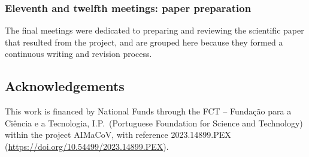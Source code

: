 \documentclass[10pt]{article}
\begin{document}
\subsubsection{Eleventh and twelfth meetings: paper preparation}
The final meetings were dedicated to preparing and reviewing the
scientific paper that resulted from the project, and are grouped here because
they formed a continuous writing and revision process.




\subsection{Acknowledgements}

This work is financed by National Funds through the
FCT -- Fundação para a Ciência e a Tecnologia, I.P.\ (Portuguese Foundation
for Science and Technology) within the project AIMaCoV, with reference 2023.14899.PEX (\url{https://doi.org/10.54499/2023.14899.PEX}).




% 
\end{document}
